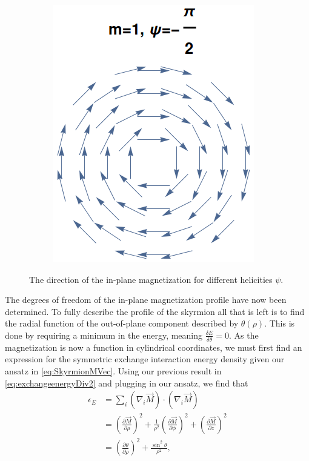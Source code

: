 \documentclass[12pt, a4paper]{article}		%
\numberwithin{equation}{section}
\begin{document}
\begin{figure}[h!]
\begin{subfigure}{.49\textwidth}
  \caption{}
  \label{fig:m1psipi2}
\end{subfigure}
\begin{subfigure}{.49\textwidth}
  \centering
  \includegraphics[width=.6\linewidth]{Figures/m1psi-pi2.png}
  \caption{}
  \label{fig:m1psi-pi2}
\end{subfigure}
\caption{The direction of the in-plane magnetization for different helicities $\psi$. }
\label{fig:m_psi_shapes}
\end{figure}
The degrees of freedom of the in-plane magnetization profile have now been determined. To fully describe the profile of the skyrmion all that is left is to find the radial function of the out-of-plane component described by $\theta(\rho)$. This is done by requiring a minimum in the energy, meaning $\frac{\delta E}{\delta\theta} = 0$. As the magnetization is now a function in cylindrical coordinates, we must first find an expression for the symmetric exchange interaction energy density given our ansatz in \eqref{eq:SkyrmionMVec}. Using our previous result in \eqref{eq:exchangeenergyDiv2} and plugging in our ansatz, we find that
\begin{align}
\nonumber\epsilon_E &= \sum_i (\nabla_i\vec{M})\cdot(\nabla_i\vec{M}) \\
\nonumber&= (\frac{\partial \vec{M}}{\partial\rho})^2+\frac{1}{\rho^2}(\frac{\partial\vec{M}}{\partial\phi})^2+(\frac{\partial\vec{M}}{\partial z})^2\\
&= (\frac{\partial \theta}{\partial\rho})^2+\frac{\sin^2\theta}{\rho^2}, \label{eq:SymExchCylindrical}
\end{align}
\end{document}
